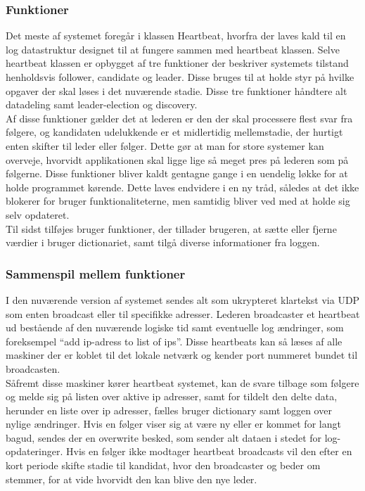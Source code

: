 \documentclass[a4paper,12pt]{article}
\begin{document}
\subsubsection{Funktioner} 
Det meste af systemet foregår i klassen Heartbeat, hvorfra der laves kald til en log datastruktur designet til at fungere sammen med heartbeat klassen. Selve heartbeat klassen er opbygget af tre funktioner der beskriver systemets tilstand henholdsvis follower, candidate og leader. Disse bruges til at holde styr på hvilke opgaver der skal løses i det nuværende stadie. Disse tre funktioner håndtere alt datadeling samt leader-election og discovery.
\\[5px]
Af disse funktioner gælder det at lederen er den der skal processere flest svar fra følgere, og kandidaten udelukkende er et midlertidig mellemstadie, der hurtigt enten skifter til leder eller følger. Dette gør at man for store systemer kan overveje, hvorvidt applikationen skal ligge lige så meget pres på lederen som på følgerne.
Disse funktioner bliver kaldt gentagne gange i en uendelig løkke for at holde programmet kørende. Dette laves endvidere i en ny tråd, således at det ikke blokerer for bruger funktionaliteterne, men samtidig bliver ved med at holde sig selv opdateret.
\\
Til sidst tilføjes bruger funktioner, der tillader brugeren, at sætte eller fjerne værdier i bruger dictionariet, samt tilgå diverse informationer fra loggen.

\subsubsection{Sammenspil mellem funktioner}
I den nuværende version af systemet sendes alt som ukrypteret klartekst via UDP som enten broadcast eller til specifikke adresser. Lederen broadcaster et heartbeat ud bestående af den nuværende logiske tid samt eventuelle log ændringer, som foreksempel “add ip-adress to list of ips”.  Disse heartbeats kan så læses af alle maskiner der er koblet til det lokale netværk og kender port nummeret bundet til broadcasten. 
\\
Såfremt disse maskiner kører heartbeat systemet, kan de svare tilbage som følgere og melde sig på listen over aktive ip adresser, samt for tildelt den delte data, herunder en liste over ip adresser, fælles bruger dictionary samt loggen over nylige ændringer. Hvis en følger viser sig at være ny eller er kommet for langt bagud, sendes der en overwrite besked, som sender alt dataen i stedet for log-opdateringer. Hvis en følger ikke modtager heartbeat broadcasts vil den efter en kort periode skifte stadie til kandidat, hvor den broadcaster og beder om stemmer, for at vide hvorvidt den kan blive den nye leder.
\end{document}
